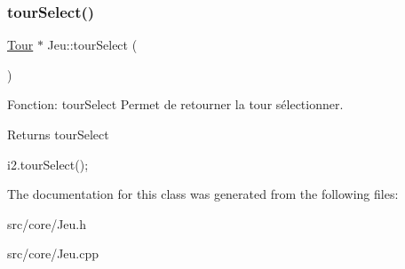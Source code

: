 \subsubsection{\texorpdfstring{tour\+Select()}{tourSelect()}}
{\footnotesize\ttfamily \hyperlink{classTour}{Tour} $\ast$ Jeu\+::tour\+Select (\begin{DoxyParamCaption}{ }\end{DoxyParamCaption})}



Fonction\+: tour\+Select Permet de retourner la tour sélectionner. 

\begin{DoxyReturn}{Returns}
tour\+Select 
\begin{DoxyCode}
i2.tourSelect();
\end{DoxyCode}
 
\end{DoxyReturn}


The documentation for this class was generated from the following files\+:\begin{DoxyCompactItemize}
\item 
src/core/Jeu.\+h\item 
src/core/Jeu.\+cpp\end{DoxyCompactItemize}
